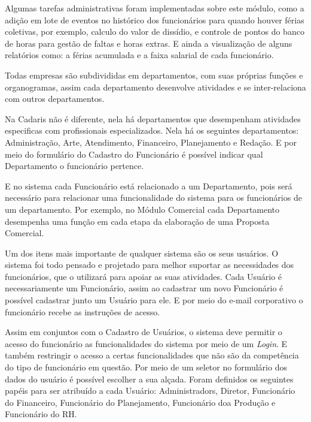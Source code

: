\documentclass[
  12pt,				%
  openany,
  oneside,
  a4paper,			%
  english,			%
  brazil
]{article}
\numberwithin{figure}{section}
\numberwithin{table}{section}
\newcounter{subsubsubsection}[subsubsection]
\begin{document}
Algumas tarefas administrativas foram implementadas sobre este módulo, como a adição em lote de eventos no histórico dos funcionários para quando houver férias coletivas, por exemplo, calculo do valor de dissídio, e controle de pontos do banco de horas para gestão de faltas e horas extras. E ainda a visualização de alguns relatórios como: a férias acumulada e a faixa salarial de cada funcionário.



Todas empresas são subdivididas em departamentos, com suas próprias funções e organogramas, assim cada departamento desenvolve atividades e se inter-relaciona com outros departamentos.

Na Cadaris não é diferente, nela há departamentos que desempenham atividades especificas com profissionais especializados. Nela há os seguintes departamentos: Administração, Arte, Atendimento, Financeiro, Planejamento e Redação. E por meio do formulário do Cadastro do Funcionário é possível indicar qual Departamento o funcionário pertence.

E no sistema cada Funcionário está relacionado a um Departamento, pois será necessário para relacionar uma funcionalidade  do sistema para os funcionários de um departamento. Por exemplo, no Módulo Comercial cada Departamento desempenha uma função em cada etapa da elaboração de uma Proposta Comercial.



Um dos itens mais importante de qualquer sistema são os seus usuários. O sistema foi todo pensado e projetado para melhor suportar as necessidades dos funcionários, que o utilizará para apoiar as suas atividades. Cada Usuário é necessariamente um Funcionário, assim ao cadastrar um novo Funcionário é possível cadastrar junto um Usuário para ele. E por meio do e-mail corporativo o funcionário recebe as instruções de acesso.

Assim em conjuntos com o Cadastro de Usuários, o sistema deve permitir o acesso do funcionário as funcionalidades do sistema por meio de um \textit{Login}. E também restringir o acesso a certas funcionalidades que não são da competência do tipo de funcionário em questão. Por meio de um seletor no formulário dos dados do usuário é possível escolher a sua alçada. Foram definidos os seguintes papéis para ser atribuído a cada Usuário: Administradors, Diretor, Funcionário do Financeiro, Funcionário do Planejamento, Funcionário doa Produção e Funcionário do RH.
\end{document}
